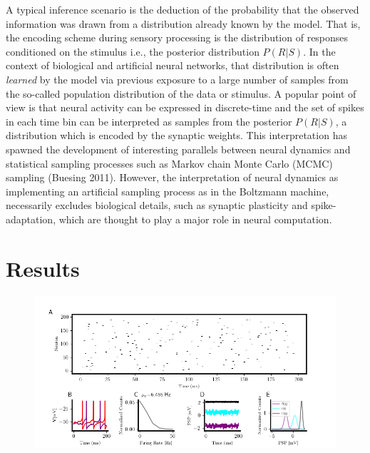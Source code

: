 \documentclass{ucetd}
\begin{document}
A typical inference scenario is the deduction of the probability that the observed information was drawn from a distribution already known by the model. That is, the encoding scheme during sensory processing is the distribution of responses conditioned on the stimulus i.e., the posterior distribution $P(R|S)$. In the context of biological and artificial neural networks, that distribution is often \emph{learned} by the model via previous exposure to a large number of samples from the so-called population distribution of the data or stimulus. A popular point of view is that neural activity can be expressed in discrete-time and the set of spikes in each time bin can be interpreted as samples from the posterior $P(R|S)$, a distribution which is encoded by the synaptic weights. This interpretation has spawned the development of interesting parallels between neural dynamics and statistical sampling processes such as Markov chain Monte Carlo (MCMC) sampling (Buesing 2011). However, the interpretation of neural dynamics as implementing an artificial sampling process as in the Boltzmann machine, necessarily excludes biological details, such as synaptic plasticity and spike-adaptation, which are thought to play a major role in neural computation.


\section{Results}


\begin{figure}
\centering
\includegraphics[width=225mm]{figure-3}
\caption{}
\end{figure}
\end{document}
